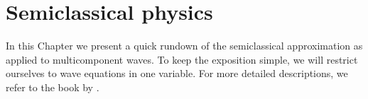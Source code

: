 
\chapter{Semiclassical physics}
\label{chap04}

In this Chapter we present a quick rundown of the semiclassical approximation as applied to multicomponent waves.
To keep the exposition simple, we will restrict ourselves to wave equations in one variable.
For more detailed descriptions, we refer to the book by \citet{tracy2014}.





